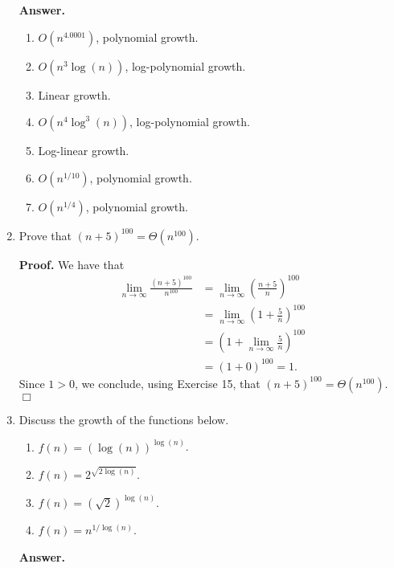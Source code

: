 \documentclass[9pt]{article}
\newcommand{\qed}{\hfill \ensuremath{\Box}}
\begin{document}
\begin{enumerate}
      \textbf{Answer.}

      \begin{enumerate}
         \item $O(n^{4.0001})$, polynomial growth.
         \item $O(n^3\log(n))$, log-polynomial growth.
         \item Linear growth.
         \item $O(n^4\log^3(n))$, log-polynomial growth.
         \item Log-linear growth.
         \item $O(n^{1/10})$, polynomial growth.
         \item $O(n^{1/4})$, polynomial growth.
      \end{enumerate}
   \item Prove that $(n+5)^{100} = \Theta(n^{100})$.

      \textbf{Proof.} We have that
      \begin{align*}
         \lim_{n \rightarrow \infty}\frac{(n+5)^{100}}{n^{100}} &=
            \lim_{n \rightarrow \infty}\left(\frac{n+5}{n}\right)^{100} \\
            &= \lim_{n \rightarrow \infty}\left(1 + \frac{5}{n}\right)^{100} \\
            &= \left(1 + \lim_{n \rightarrow \infty}\frac{5}{n}\right)^{100} \\
            &= (1 + 0)^{100} = 1.
      \end{align*}
      Since $1 > 0$, we conclude, using Exercise 15, that
      $(n+5)^{100} = \Theta(n^{100})$. \qed
   \item Discuss the growth of the functions below.
         \begin{enumerate}
            \item $f(n) = (\log(n))^{\log(n)}$.
            \item $f(n) = 2^{\sqrt{2\log(n)}}$.
            \item $f(n) = (\sqrt{2})^{\log(n)}$.
            \item $f(n) = n^{1/\log(n)}$.
         \end{enumerate}

      \textbf{Answer.}


\end{enumerate}
\end{document}
